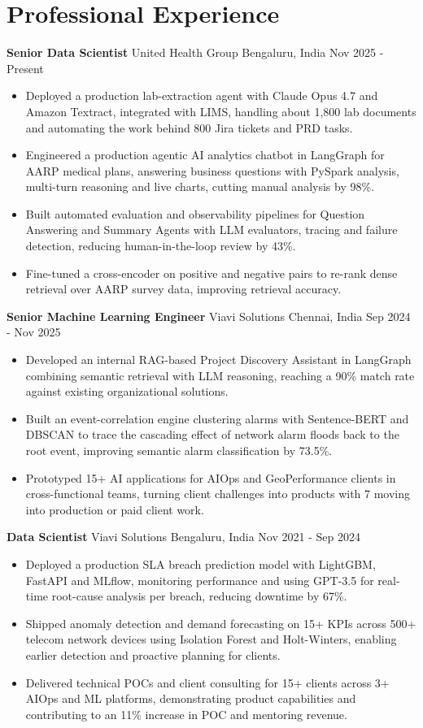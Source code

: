 \documentclass[10pt,a4paper]{article}
\newcommand{\role}[4]{\textbf{#1} \textbar{} #2 \hfill #3 \textbar{} #4\par}
\begin{document}
\section{Professional Experience}
\role{Senior Data Scientist}{United Health Group}{Bengaluru, India}{Nov 2025 - Present}
\begin{itemize}
  \item Deployed a production lab-extraction agent with Claude Opus 4.7 and Amazon Textract, integrated with LIMS, handling about 1,800 lab documents and automating the work behind 800 Jira tickets and PRD tasks.
  \item Engineered a production agentic AI analytics chatbot in LangGraph for AARP medical plans, answering business questions with PySpark analysis, multi-turn reasoning and live charts, cutting manual analysis by 98\%.
  \item Built automated evaluation and observability pipelines for Question Answering and Summary Agents with LLM evaluators, tracing and failure detection, reducing human-in-the-loop review by 43\%.
  \item Fine-tuned a cross-encoder on positive and negative pairs to re-rank dense retrieval over AARP survey data, improving retrieval accuracy.
\end{itemize}
\vspace{3pt}
\role{Senior Machine Learning Engineer}{Viavi Solutions}{Chennai, India}{Sep 2024 - Nov 2025}
\begin{itemize}
  \item Developed an internal RAG-based Project Discovery Assistant in LangGraph combining semantic retrieval with LLM reasoning, reaching a 90\% match rate against existing organizational solutions.
  \item Built an event-correlation engine clustering alarms with Sentence-BERT and DBSCAN to trace the cascading effect of network alarm floods back to the root event, improving semantic alarm classification by 73.5\%.
  \item Prototyped 15+ AI applications for AIOps and GeoPerformance clients in cross-functional teams, turning client challenges into products with 7 moving into production or paid client work.
\end{itemize}
\vspace{3pt}
\role{Data Scientist}{Viavi Solutions}{Bengaluru, India}{Nov 2021 - Sep 2024}
\begin{itemize}
  \item Deployed a production SLA breach prediction model with LightGBM, FastAPI and MLflow, monitoring performance and using GPT-3.5 for real-time root-cause analysis per breach, reducing downtime by 67\%.
  \item Shipped anomaly detection and demand forecasting on 15+ KPIs across 500+ telecom network devices using Isolation Forest and Holt-Winters, enabling earlier detection and proactive planning for clients.
  \item Delivered technical POCs and client consulting for 15+ clients across 3+ AIOps and ML platforms, demonstrating product capabilities and contributing to an 11\% increase in POC and mentoring revenue.
\end{itemize}
\end{document}
